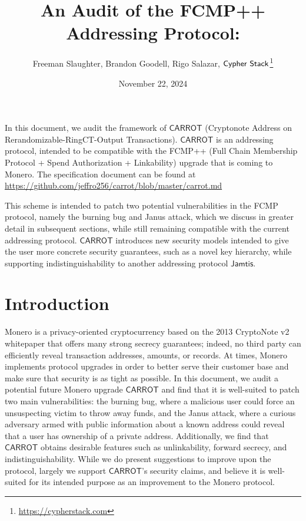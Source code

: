 \documentclass{article}
\title{An Audit of the FCMP++ Addressing Protocol: \carr}
\author{Freeman Slaughter, Brandon Goodell, Rigo Salazar, $\sf{Cypher \ Stack}$\thanks{\url{https://cypherstack.com}}}
\date{November 22, 2024}
\theoremstyle{definition}
\newcommand{\6}{\mathbf}
\newcommand{\7}{\mathcal}
\renewcommand{\sf}[1]{{\mathsf{#1}}}
\newcommand{\carr}{$\sf{CARROT}$ }
\begin{document}
\maketitle

In this document, we audit the framework of \carr (Cryptonote Address on Rerandomizable-RingCT-Output Transactions). \carr is an addressing protocol, intended to be compatible with the FCMP++ (Full Chain Membership Protocol + Spend Authorization + Linkability) upgrade that is coming to Monero. The specification document can be found at \url{https://github.com/jeffro256/carrot/blob/master/carrot.md} 
\medskip 



This scheme is intended to patch two potential vulnerabilities in the FCMP protocol, namely the burning bug and Janus attack, which we discuss in greater detail in subsequent sections, while still remaining compatible with the current addressing protocol. 
\carr introduces new security models intended to give the user more concrete security guarantees, such as a novel key hierarchy, while supporting indistinguishability to another addressing protocol $\sf{Jamtis}$.




\tableofcontents






\section{Introduction} 

Monero is a privacy-oriented cryptocurrency based on the 2013 CryptoNote v2 whitepaper \cite{CryptoNote} that offers many strong secrecy guarantees; indeed, no third party can efficiently reveal transaction addresses, amounts, or records. 
At times, Monero implements protocol upgrades in order to better serve their customer base and make sure that security is as tight as possible. 
In this document, we audit a potential future Monero upgrade \carr and find that it is well-suited to patch two main vulnerabilities: the burning bug, where a malicious user could force an unsuspecting victim to throw away funds, and the Janus attack, where a curious adversary armed with public information about a known address could reveal that a user has ownership of a private address. 
Additionally, we find that \carr obtains desirable features such as unlinkability, forward secrecy, and indistinguishability. 
While we do present suggestions to improve upon the protocol, largely we support $\sf{CARROT}$'s security claims, and believe it is well-suited for its intended purpose as an improvement to the Monero protocol.  
\end{document}
